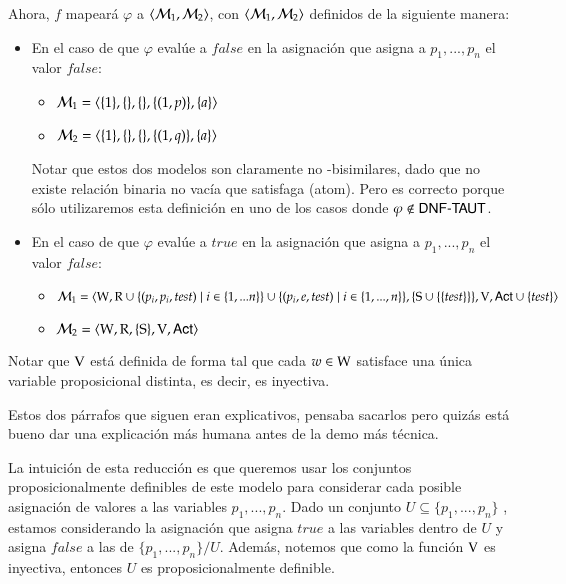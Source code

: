\begin{demostracion}
    Ahora, $f$ mapeará $\varphi$ a $\langle \mathcal{M}_1,\mathcal{M}_2 \rangle$, con $\langle \mathcal{M}_1,\mathcal{M}_2 \rangle$ definidos de la siguiente manera:

    \begin{itemize}
        \item En el caso de que $\varphi$ evalúe a $false$ en la asignación que asigna a $p_1,...,p_n$ el valor $false$:

        \begin{itemize}
            \item $\mathcal{M}_1=\langle \{1\},\{\},\{\},\{(1,p)\},\{a\} \rangle$
            \item $\mathcal{M}_2=\langle \{1\},\{\},\{\},\{(1,q)\},\{a\} \rangle$
        \end{itemize}

        Notar que estos dos modelos son claramente no \KHilogic-bisimilares, dado que no existe relación binaria no vacía que satisfaga (atom). Pero es correcto porque sólo utilizaremos esta definición en uno de los casos donde $\varphi \not \in \rm\textsf{DNF-TAUT}$. 
        
        \item En el caso de que $\varphi$ evalúe a $true$ en la asignación que asigna a $p_1,...,p_n$ el valor $false$:
        
        \begin{itemize}
            \item $\mathcal{M}_1=\langle \mathrm{W},\mathrm{R} \cup \{(p_i,p_i,test) \mid i \in \{1,...n\}\} \cup \{(p_i,e,test)\mid i \in \{1,...,n\}\},\{\mathrm{S} \cup \{\{test\}\} \},\mathrm{V},{\rm \sf Act} \cup \{test\} \rangle$
            \item $\mathcal{M}_2=\langle \mathrm{W},\mathrm{R},\{ \mathrm{S} \},\mathrm{V},{\rm \sf Act} \rangle$
        \end{itemize}
    \end{itemize}

    
    Notar que $\mathrm{V}$ está definida de forma tal que cada $w\in\mathrm{W}$ satisface una única variable proposicional distinta, es decir, es inyectiva.


\medskip\medskip
    Estos dos párrafos que siguen eran explicativos, pensaba sacarlos pero quizás está bueno dar una explicación más humana antes de la demo más técnica.

    La intuición de esta reducción es que queremos usar los conjuntos proposicionalmente definibles de este modelo para considerar cada posible asignación de valores a las variables $p_1,...,p_n$. Dado un conjunto $U \subseteq \{p_1,...,p_n\}$ , estamos considerando la asignación que asigna $true$ a las variables dentro de $U$ y asigna $false$ a las de $\{p_1,...,p_n\}/U$. Además, notemos que como la función $\mathrm{V}$ es inyectiva, entonces $U$ es proposicionalmente definible.
 

\end{demostracion}

